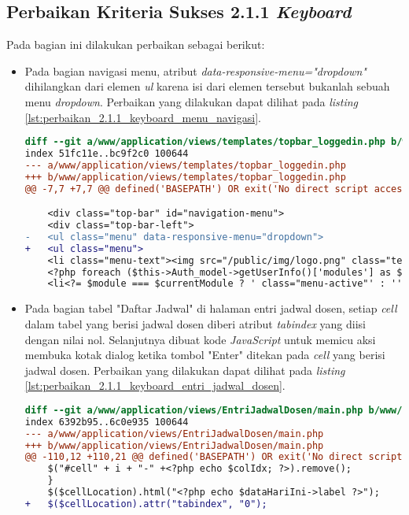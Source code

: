 \subsection{Perbaikan Kriteria Sukses 2.1.1 \textit{Keyboard}}
\label{subsec:perbaikan_kriteria_sukses_2.1.1}
Pada bagian ini dilakukan perbaikan sebagai berikut:

\begin{itemize}
\item Pada bagian navigasi menu, atribut \textit{data-responsive-menu="dropdown"} dihilangkan dari elemen \textit{ul} karena isi dari elemen tersebut bukanlah sebuah menu \textit{dropdown}. Perbaikan yang dilakukan dapat dilihat pada \textit{listing} \ref{lst:perbaikan_2.1.1_keyboard_menu_navigasi}.
\begin{lstlisting}[frame=single, label={lst:perbaikan_2.1.1_keyboard_menu_navigasi}, language=diff, caption=Perbaikan Kriteria Sukses 2.1.1 - Penggunaan \textit{Keyboard} pada Menu Navigasi]
diff --git a/www/application/views/templates/topbar_loggedin.php b/www/application/views/templates/topbar_loggedin.php
index 51fc11e..bc9f2c0 100644
--- a/www/application/views/templates/topbar_loggedin.php
+++ b/www/application/views/templates/topbar_loggedin.php
@@ -7,7 +7,7 @@ defined('BASEPATH') OR exit('No direct script access allowed');

    <div class="top-bar" id="navigation-menu">
    <div class="top-bar-left">
-   <ul class="menu" data-responsive-menu="dropdown">
+   <ul class="menu">
    <li class="menu-text"><img src="/public/img/logo.png" class="textsized" alt="B"/></li>
    <?php foreach ($this->Auth_model->getUserInfo()['modules'] as $module): ?>
    <li<?= $module === $currentModule ? ' class="menu-active"' : '' ?>><a href="/<?= $module ?>"><?= $this->config->item('module-names')[$module] ?></a></li>
\end{lstlisting}

\item Pada bagian tabel "Daftar Jadwal" di halaman entri jadwal dosen, setiap \textit{cell} dalam tabel yang berisi jadwal dosen diberi atribut \textit{tabindex} yang diisi dengan nilai nol. Selanjutnya dibuat kode \textit{JavaScript} untuk memicu aksi membuka kotak dialog ketika tombol "Enter" ditekan pada \textit{cell} yang berisi jadwal dosen. Perbaikan yang dilakukan dapat dilihat pada \textit{listing} \ref{lst:perbaikan_2.1.1_keyboard_entri_jadwal_dosen}.
\begin{lstlisting}[frame=single, label={lst:perbaikan_2.1.1_keyboard_entri_jadwal_dosen}, language=diff, caption=Perbaikan Kriteria Sukses 2.1.1 - Penggunaan \textit{Keyboard} pada Halaman Entri Jadwal Dosen]
diff --git a/www/application/views/EntriJadwalDosen/main.php b/www/application/views/EntriJadwalDosen/main.php
index 6392b95..6c0e935 100644
--- a/www/application/views/EntriJadwalDosen/main.php
+++ b/www/application/views/EntriJadwalDosen/main.php
@@ -110,12 +110,21 @@ defined('BASEPATH') OR exit('No direct script access allowed');
    $("#cell" + i + "-" +<?php echo $colIdx; ?>).remove();
    }
    $($cellLocation).html("<?php echo $dataHariIni->label ?>");
+   $($cellLocation).attr("tabindex", "0");


\end{lstlisting}
\end{itemize}
